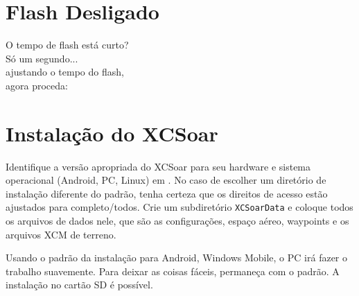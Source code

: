 \documentclass[a4paper,12pt]{refrep}
\begin{document}
\section*{{\color[rgb]{.9,.85,0}Flash} Desligado}

\vspace{2em}
\hspace*{1cm} O tempo de flash está curto?\\
\hspace*{4cm} Só um segundo...\\
\hspace*{6cm} ajustando o tempo do flash,\\
\hspace*{10cm} agora proceda: 


\setlength{\parskip}{0.3\baselineskip}
\newpage
\section{Instalação do XCSoar }\label{ch:XCSinstall}


Identifique a versão apropriada do XCSoar para seu hardware e sistema operacional \textsf{(Android, PC, Linux)}
em \xcsoarwebsite{}.
No caso de escolher um diretório de instalação diferente do padrão, tenha certeza que os direitos de acesso estão ajustados para completo/todos.  Crie um subdiretório \texttt{XCSoarData} e coloque todos os arquivos de dados nele, que são as configurações, espaço aéreo, waypoints e os arquivos XCM de terreno.

Usando o padrão da instalação para Android, Windows Mobile, o PC irá fazer o trabalho suavemente.  Para deixar as coisas fáceis, permaneça com o padrão.  A instalação no cartão SD é possível.
\end{document}
